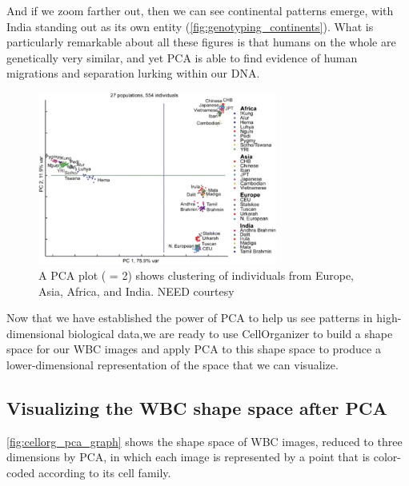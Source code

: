 And if we zoom farther out, then we can see continental patterns emerge, with India standing out as its own entity (\autoref{fig:genotyping_continents}). What is particularly remarkable about all these figures is that humans on the whole are genetically very similar, and yet PCA is able to find evidence of human migrations and separation lurking within our DNA.

\begin{figure}[h]
\centering
\mySfFamily
\includegraphics[width = 0.7\textwidth]{../images/genotyping_continents.png}
\caption{A PCA plot ( = 2) shows clustering of individuals from Europe, Asia, Africa, and India. NEED courtesy}
\label{fig:genotyping_continents}
\end{figure}

Now that we have established the power of PCA to help us see patterns in high-dimensional biological data, we are ready to use CellOrganizer to build a shape space for our WBC images and apply PCA to this shape space to produce a lower-dimensional representation of the space that we can visualize.

\FloatBarrier
{}
\subsection{Visualizing the WBC shape space after PCA}

\autoref{fig:cellorg_pca_graph} shows the shape space of WBC images, reduced to three dimensions by PCA, in which each image is represented by a point that is color-coded according to its cell family.\\


